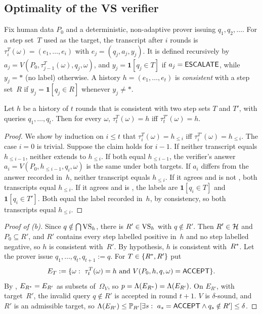 \subsection{Optimality of the VS verifier}\label{app:caution:vs}

Fix human data $P_0$ and a deterministic, non-adaptive prover issuing $q_1,q_2,\dots$. For a step set~$T$ used as the target, the transcript after $i$ rounds is $\tau^T_i(\omega)=(e_1,\dots,e_i)$ with $e_j=(q_j,a_j,y_j)$. It is defined recursively by $a_j=V(P_0,\tau^T_{j-1}(\omega),q_j,\omega)$, and $y_j=\mathbf 1[q_j\in T]$ if $a_j=\textsf{ESCALATE}$, while $y_j=\ast$ (no label) otherwise. A history $h=(e_1,\dots,e_t)$ is \emph{consistent} with a step set~$R$ if $y_j=\mathbf 1[q_j\in R]$ whenever $y_j\neq\ast$.

\begin{lemma}\label{lem:app:caution:coupling}
Let $h$ be a history of $t$ rounds that is consistent with two step sets $T$ and $T'$, with queries $q_1,\dots,q_t$. Then for every $\omega$, $\tau^T_t(\omega)=h$ iff $\tau^{T'}_t(\omega)=h$.
\end{lemma}

\begin{proof}
We show by induction on $i\le t$ that $\tau^T_i(\omega)=h_{\le i}$ iff $\tau^{T'}_i(\omega)=h_{\le i}$. The case $i=0$ is trivial. Suppose the claim holds for $i-1$. If neither transcript equals $h_{\le i-1}$, neither extends to $h_{\le i}$. If both equal $h_{\le i-1}$, the verifier's answer $a_i=V(P_0,h_{\le i-1},q_i,\omega)$ is the same under both targets. If $a_i$ differs from the answer recorded in~$h$, neither transcript equals $h_{\le i}$. If it agrees and is not \ESCALATE, both transcripts equal $h_{\le i}$. If it agrees and is \ESCALATE, the labels are $\mathbf 1[q_i\in T]$ and $\mathbf 1[q_i\in T']$. Both equal the label recorded in~$h$, by consistency, so both transcripts equal $h_{\le i}$.
\end{proof}

\begin{proof}[Proof of (b)]
Since $q\notin\bigcap\mathrm{VS}_h$, there is $R'\in\mathrm{VS}_h$ with $q\notin R'$. Then $R'\in\mathcal{H}$ and $P_0\subseteq R'$, and $R'$ contains every step labelled positive in~$h$ and no step labelled negative, so $h$ is consistent with~$R'$. By hypothesis, $h$ is consistent with~$R^{*}$. Let the prover issue $q_1,\dots,q_t,q_{t+1}:=q$. For $T\in\{R^{*},R'\}$ put
\[
E_T:=\{\omega:\ \tau^T_t(\omega)=h\ \text{and}\ V(P_0,h,q,\omega)=\ACCEPT\}.
\]
By , $E_{R^{*}}=E_{R'}$ as subsets of~$\Omega_V$, so $p=\Lambda(E_{R^{*}})=\Lambda(E_{R'})$. On $E_{R'}$, with target~$R'$, the invalid query $q\notin R'$ is accepted in round $t+1$. $V$ is $\delta$-sound, and $R'$ is an admissible target, so $\Lambda(E_{R'})\le\Prob_{R'}[\exists s:\ a_s=\ACCEPT\wedge q_s\notin R']\le\delta$.
\end{proof}

